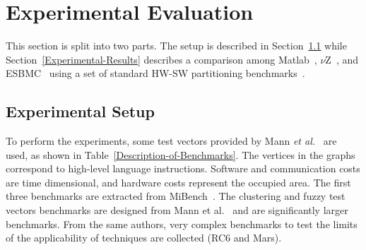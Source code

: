 \section{Experimental Evaluation}
\label{Experimental-Evaluation}

This section is split into two parts. The setup is described in Section~\ref{Experimental-Setup} while Section~\ref{Experimental-Results} describes a comparison among Matlab~\cite{TheMathWorks2013}, $\nu$Z~\cite{Bjorner2015}, and ESBMC~\cite{Trindade2015} using a set of standard HW-SW partitioning benchmarks~\cite{Mann2007}.

\subsection{Experimental Setup}
\label{Experimental-Setup}

To perform the experiments, some test vectors provided by Mann {\it et al.}~\cite{Mann2007} are used, as shown in Table~\ref{Description-of-Benchmarks}. The vertices in the graphs correspond to high-level language instructions. Software and communication costs are time dimensional, and hardware costs represent the occupied area. The first three benchmarks are extracted from MiBench~\cite{Guthaus2001}. The clustering and fuzzy test vectors benchmarks are designed from Mann et al.~\cite{Mann2007} and are significantly larger benchmarks. From the same authors,  very complex benchmarks to test the limits of the applicability of techniques are collected (RC$6$ and Mars).

